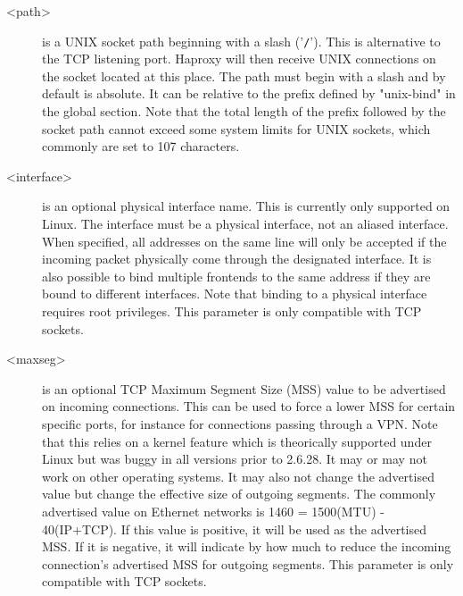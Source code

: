 \begin{description}
  \item[<path>]        is a UNIX socket path beginning with a slash ('\verb|/|'). This is
                  alternative to the TCP listening port. Haproxy will then
                  receive UNIX connections on the socket located at this place.
                  The path must begin with a slash and by default is absolute.
                  It can be relative to the prefix defined by "unix-bind" in
                  the global section. Note that the total length of the prefix
                  followed by the socket path cannot exceed some system limits
                  for UNIX sockets, which commonly are set to 107 characters.

  \item[<interface>]   is an optional physical interface name. This is currently
                  only supported on Linux. The interface must be a physical
                  interface, not an aliased interface. When specified, all
                  addresses on the same line will only be accepted if the
                  incoming packet physically come through the designated
                  interface. It is also possible to bind multiple frontends to
                  the same address if they are bound to different interfaces.
                  Note that binding to a physical interface requires root
                  privileges. This parameter is only compatible with TCP
                  sockets.

  \item[<maxseg>]      is an optional TCP Maximum Segment Size (MSS) value to be
                  advertised on incoming connections. This can be used to force
                  a lower MSS for certain specific ports, for instance for
                  connections passing through a VPN. Note that this relies on a
                  kernel feature which is theorically supported under Linux but
                  was buggy in all versions prior to 2.6.28. It may or may not
                  work on other operating systems. It may also not change the
                  advertised value but change the effective size of outgoing
                  segments. The commonly advertised value on Ethernet networks
                  is 1460 = 1500(MTU) - 40(IP+TCP). If this value is positive,
                  it will be used as the advertised MSS. If it is negative, it
                  will indicate by how much to reduce the incoming connection's
                  advertised MSS for outgoing segments. This parameter is only
                  compatible with TCP sockets.


\end{description}
